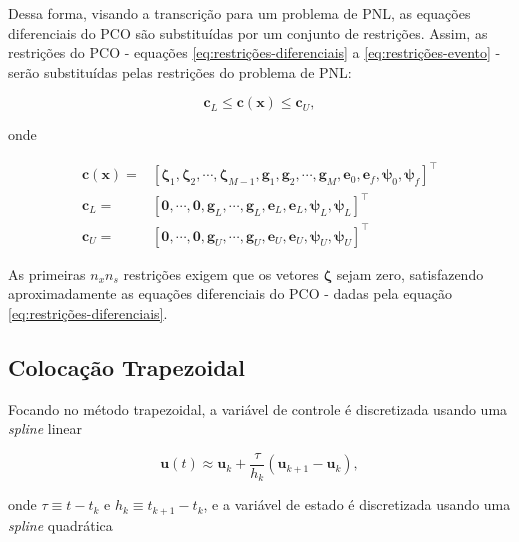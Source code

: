 Dessa forma, visando a transcrição para um problema de PNL, as equações diferenciais do PCO são substituídas por um conjunto de restrições. Assim, as restrições do PCO - equações \ref{eq:restrições-diferenciais} a \ref{eq:restrições-evento} - serão substituídas pelas restrições do problema de PNL:

\begin{equation}
    \mathbf{c}_L \leq \mathbf{c}(\mathbf{x}) \leq \mathbf{c}_U,
\end{equation}

\noindent onde

\begin{equation}
\begin{aligned}
    \mathbf{c}(\mathbf{x}) =& \left[ \boldsymbol{\zeta}_1, \boldsymbol{\zeta}_2, \cdots, \boldsymbol{\zeta}_{M-1}, \mathbf{g}_1, \mathbf{g}_2, \cdots, \mathbf{g}_{M}, \mathbf{e}_0, \mathbf{e}_f, \boldsymbol{\psi}_0, \boldsymbol{\psi}_f \right]^\intercal \\
    \mathbf{c}_L =& \left[ \mathbf{0}, \cdots, \mathbf{0}, \mathbf{g}_L, \cdots, \mathbf{g}_L, \mathbf{e}_L, \mathbf{e}_L, \boldsymbol{\psi}_L, \boldsymbol{\psi}_L \right]^\intercal \\
    \mathbf{c}_U =& \left[ \mathbf{0}, \cdots, \mathbf{0}, \mathbf{g}_U, \cdots, \mathbf{g}_U, \mathbf{e}_U, \mathbf{e}_U, \boldsymbol{\psi}_U, \boldsymbol{\psi}_U \right]^\intercal
\end{aligned}
\end{equation}

As primeiras $n_x n_s$ restrições exigem que os vetores $\boldsymbol{\zeta}$ sejam zero, satisfazendo aproximadamente as equações diferenciais do PCO - dadas pela equação \ref{eq:restrições-diferenciais}.


\subsection{Colocação Trapezoidal}

Focando no método trapezoidal, a variável de controle é discretizada usando uma \textit{spline} linear 

\begin{equation}
    \mathbf{u}(t) \approx \mathbf{u}_k + \dfrac{\tau}{h_k} (\mathbf{u}_{k+1} - \mathbf{u}_k),
\end{equation}

\noindent onde $\tau \equiv t - t_k$ e $h_k \equiv t_{k+1} - t_k$, e a variável de estado é discretizada usando uma \textit{spline} quadrática

